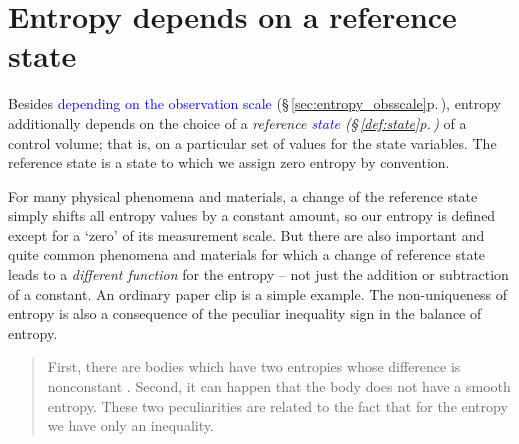 \documentclass[a4paper,12pt,%
onecolumn,oneside,%
british%
]{memoir}
\newcommand*{\amp}{\&}
\renewcommand*{\|}[1][]{\nonscript\:#1\vert\nonscript\:\mathopen{}}
\newcommand*{\sect}{\S}%
\renewcommand*{\autoref}[3][\sect\,\ref]{\textcolor{blue}{#3} {\color{blue}\scriptsize(\faIcon[regular]{eye}\;#1{#2}\;p.\,\pageref{#2})}}
\begin{document}
\section{Entropy depends on a reference state}
\label{sec:entropy_nonunique}

Besides \autoref{sec:entropy_obsscale}{depending on the observation scale}, entropy additionally depends on the choice of a \emph{reference \autoref{def:state}{state}} of a control volume; that is, on a particular set of values for the state variables. The reference state is a state to which we assign zero entropy by convention.



%
%
For many physical phenomena and materials, a change of the reference state simply shifts all entropy values by a constant amount, so our entropy is defined except for a \enquote*{zero} of its measurement scale. But there are also important and quite common phenomena and materials for which a change of reference state leads to a \emph{different function} for the entropy -- not just the addition or subtraction of a constant. An ordinary paper clip is a simple example. The non-uniqueness of entropy is also a consequence of the peculiar inequality sign in the balance of entropy.
\begin{quote}\footnotesize
  First, there are bodies which have two entropies \textelp{} whose difference is nonconstant \textelp{}. Second, it can happen that the body does not have a smooth entropy. These two peculiarities are related to the fact that for the entropy we have only an inequality.\sourceatright{\parencites[\sect\,7.6]{silhavy1997}}
\end{quote}
\end{document}
